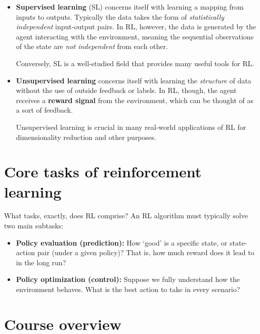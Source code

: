\documentclass[
  letterpaper,
  DIV=11,
  numbers=noendperiod]{scrreprt}
\theoremstyle{plain}
\theoremstyle{plain}
\theoremstyle{definition}
\theoremstyle{definition}
\theoremstyle{remark}
\begin{document}
\begin{itemize}
\item
  \textbf{Supervised learning} (SL) concerns itself with learning a
  mapping from inputs to outputs. Typically the data takes the form of
  \emph{statistically independent} input-output pairs. In RL, however,
  the data is generated by the agent interacting with the environment,
  meaning the sequential observations of the state are \emph{not
  independent} from each other.

  Conversely, SL is a well-studied field that provides many useful tools
  for RL.
\item
  \textbf{Unsupervised learning} concerns itself with learning the
  \emph{structure} of data without the use of outside feedback or
  labels. In RL, though, the agent receives a \textbf{reward signal}
  from the environment, which can be thought of as a sort of feedback.

  Unsupervised learning is crucial in many real-world applications of RL
  for dimensionality reduction and other purposes.
\end{itemize}

\section*{Core tasks of reinforcement
learning}\label{core-tasks-of-reinforcement-learning}


What tasks, exactly, does RL comprise? An RL algorithm must typically
solve two main subtasks:

\begin{itemize}
\item
  \textbf{Policy evaluation (prediction):} How `good' is a specific
  state, or state-action pair (under a given policy)? That is, how much
  reward does it lead to in the long run?
\item
  \textbf{Policy optimization (control):} Suppose we fully understand
  how the environment behaves. What is the best action to take in every
  scenario?
\end{itemize}

\section*{Course overview}\label{course-overview}
\end{document}
